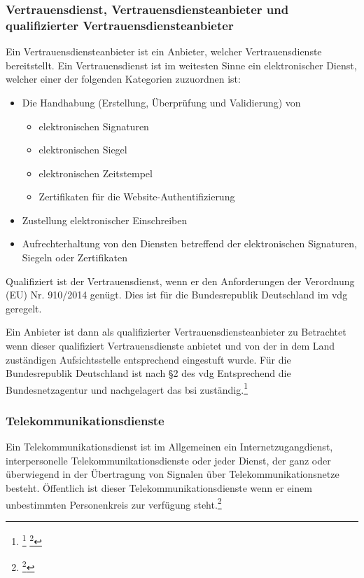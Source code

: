 \documentclass[11pt,a4paper,hidelinks]{article}   %
\begin{document}
            \subsubsection{Vertrauensdienst, Vertrauensdiensteanbieter und qualifizierter Vertrauensdiensteanbieter}
            Ein Vertrauensdiensteanbieter ist ein Anbieter, welcher Vertrauensdienste bereitstellt. Ein Vertrauensdienst ist im weitesten Sinne ein elektronischer Dienst, welcher einer der folgenden Kategorien zuzuordnen ist:
            \begin{itemize}
                \item Die Handhabung (Erstellung, Überprüfung und Validierung) von
                \begin{itemize}
                    \item elektronischen Signaturen
                    \item elektronischen Siegel
                    \item elektro­nischen Zeitstempel
                    \item Zertifikaten für die Website-Authentifizierung
                \end{itemize}
                \item Zustellung elektronischer Einschreiben
                \item Aufrechterhaltung von den Diensten betreffend der elektronischen Signaturen, Siegeln oder Zertifikaten
            \end{itemize}
            Qualifiziert ist der Vertrauensdienst, wenn er den Anforderungen der Verordnung (EU) Nr. 910/2014 genügt. Dies ist für die Bundesrepublik Deutschland im \gls{vdg} geregelt.

            Ein Anbieter ist dann als qualifizierter Vertrauensdiensteanbieter zu Betrachtet wenn dieser qualifiziert Vertrauensdienste anbietet und von der in dem Land zuständigen Aufsichtsstelle entsprechend eingestuft wurde. Für die Bundesrepublik Deutschland ist nach §2 des \gls{vdg} Entsprechend die Bundesnetzagentur und nachgelagert das \gls{bsi} zuständig.\footnote{
                \footcite[Vgl. Artikel 3, Nummer 16, 17, 19 und 20][]{EU910-2014}
                \footcite[Vgl. §2][]{VDG}
            }

            \subsubsection{Telekommunikationsdienste}
            Ein Telekommunikationsdienst ist im Allgemeinen ein Internetzugangdienst, interpersonelle Telekommunikationsdienste oder jeder Dienst, der ganz oder überwiegend in der Übertragung von Signalen über Telekommunikationsnetze besteht. Öffentlich ist dieser Telekommunikationsdienste wenn er einem unbestimmten Personenkreis zur verfügung steht.\footnote{
                \footcite[Vgl. §3 Nummer 60][]{TKG}
            }
\end{document}
